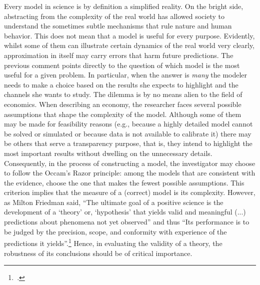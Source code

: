 \documentclass[english, a4paper, 12pt]{article}
\begin{document}
Every model in science is by definition a simplified reality. On the bright side, abstracting from the complexity of the real world has allowed society to understand the sometimes subtle mechanisms that rule nature and human behavior. This does not mean that a model is useful for every purpose. Evidently, whilst some of them can illustrate certain dynamics of the real world very clearly, approximation in itself may carry errors that harm future predictions. The previous comment points directly to the question of which model is the most useful for a given problem. In particular, when the answer is \textit{many} the modeler needs to make a choice based on the results she expects to highlight and the channels she wants to study. The dilemma is by no means alien to the field of economics. When describing an economy, the researcher faces several possible assumptions that shape the complexity of the model. Although some of them may be made for feasibility reasons (e.g., because a highly detailed model cannot be solved or simulated or because data is not available to calibrate it) there may be others that serve a transparency purpose, that is, they intend to highlight the most important results without dwelling on the unnecessary details. Consequently, in the process of constructing a model, the investigator may choose to follow the Occam's Razor principle: among the models that are consistent with the evidence, choose the one that makes the fewest possible assumptions. This criterion implies that the measure of a (correct) model is its complexity. However, as Milton Friedman said, ``The ultimate goal of a positive science is the development of a `theory' or, `hypothesis' that yields valid and meaningful (...) predictions about phenomena not yet observed'' and thus ``Its performance is to be judged by the precision, scope, and conformity with experience of the predictions it yields''.\footnote{\,\cite{FriedmanPositive}.} Hence, in evaluating the validity of a theory, the robustness of its conclusions should be of critical importance.
\end{document}
